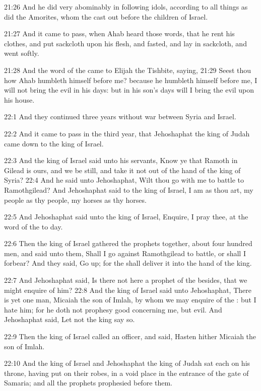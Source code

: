 21:26 And he did very abominably in following idols, according to all
things as did the Amorites, whom the \LORD cast out before the children
of Israel.

21:27 And it came to pass, when Ahab heard those words, that he rent
his clothes, and put sackcloth upon his flesh, and fasted, and lay in
sackcloth, and went softly.

21:28 And the word of the \LORD came to Elijah the Tishbite, saying,
21:29 Seest thou how Ahab humbleth himself before me? because he
humbleth himself before me, I will not bring the evil in his days: but
in his son's days will I bring the evil upon his house.

22:1 And they continued three years without war between Syria and
Israel.

22:2 And it came to pass in the third year, that Jehoshaphat the king
of Judah came down to the king of Israel.

22:3 And the king of Israel said unto his servants, Know ye that
Ramoth in Gilead is ours, and we be still, and take it not out of the
hand of the king of Syria?  22:4 And he said unto Jehoshaphat, Wilt
thou go with me to battle to Ramothgilead? And Jehoshaphat said to the
king of Israel, I am as thou art, my people as thy people, my horses
as thy horses.

22:5 And Jehoshaphat said unto the king of Israel, Enquire, I pray
thee, at the word of the \LORD to day.

22:6 Then the king of Israel gathered the prophets together, about
four hundred men, and said unto them, Shall I go against Ramothgilead
to battle, or shall I forbear? And they said, Go up; for the \LORD
shall deliver it into the hand of the king.

22:7 And Jehoshaphat said, Is there not here a prophet of the \LORD
besides, that we might enquire of him?  22:8 And the king of Israel
said unto Jehoshaphat, There is yet one man, Micaiah the son of Imlah,
by whom we may enquire of the \LORD: but I hate him; for he doth not
prophesy good concerning me, but evil. And Jehoshaphat said, Let not
the king say so.

22:9 Then the king of Israel called an officer, and said, Hasten
hither Micaiah the son of Imlah.

22:10 And the king of Israel and Jehoshaphat the king of Judah sat
each on his throne, having put on their robes, in a void place in the
entrance of the gate of Samaria; and all the prophets prophesied
before them.

